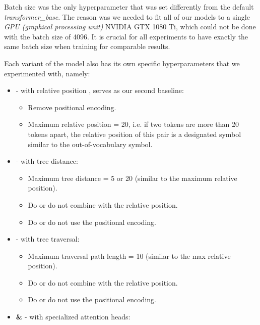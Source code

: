 Batch size was the only hyperparameter that was set differently from the default \textit{transformer\_base}. 
The reason was we needed to fit all of our models to a single \textit{GPU (graphical processing unit)} NVIDIA GTX 1080 Ti, which could not be done with the batch size of 4096. It is crucial for all experiments to have exactly the same batch size when training for comparable results.

Each variant of the \transformer model also has its own specific hyperparameters that we experimented with, namely:

\begin{itemize}
    \item \textbf{\transformerrel} - \transformer with relative position \citep{DBLP:conf/naacl/ShawUV18}, serves as our second baseline:
        \begin{itemize}
            \item Remove positional encoding.
            \item Maximum relative position = 20, i.e. if two tokens are more than 20 tokens apart, the relative position of this pair is a designated symbol similar to the out-of-vocabulary symbol.
        \end{itemize}
    \item \textbf{\TreeDistance} - \transformer with tree distance:
        \begin{itemize}
            \item Maximum tree distance = 5 or 20 (similar to the maximum relative position).
            \item Do or do not combine with the relative position.
            \item Do or do not use the positional encoding.
        \end{itemize}
    \item \textbf{\TreeTraversal} - \transformer with tree traversal:
        \begin{itemize}
            \item Maximum traversal path length = 10 (similar to the max relative position).
            \item Do or do not combine with the relative position.
            \item Do or do not use the positional encoding.
        \end{itemize}
    \item \textbf{\SpecPOS \& \SpecDep} - \transformer with specialized attention heads:
        \begin{itemize}

\end{itemize}
\end{itemize}
